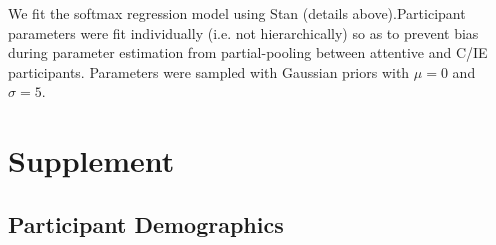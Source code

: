 \documentclass[a4paper,notitlepage,12pt]{article}
\begin{document}
We fit the softmax regression model using Stan (details above).Participant parameters were fit individually (i.e. not hierarchically)  so as to prevent bias during parameter estimation from partial-pooling between attentive and C/IE participants. Parameters were sampled with Gaussian priors with $\mu = 0$ and $\sigma = 5$. 

\printbibliography
\pagebreak


\section*{Supplement}
\setcounter{figure}{0}
\setcounter{table}{0}
\renewcommand{\thetable}{S\arabic{table}}

\subsection*{Participant Demographics}
\end{document}
